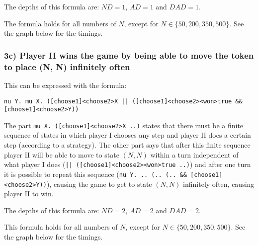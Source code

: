 \documentclass[10pt,a4paper]{article}
\begin{document}
The depths of this formula are: $ND = 1$, $AD = 1$ and $DAD = 1$.

The formula holds for all numbers of $N$, except for $N \in \{50, 200, 350, 500\}$. See the graph below for the timings.


\subsubsection{3c) Player II wins the game by being able to move the token to place (N, N) infinitely often}\label{board3}
This can be expressed with the formula:

\begin{center}
	{\tt nu Y. mu X. ([choose1]<choose2>X || ([choose1]<choose2><won>true \&\& [choose1]<choose2>Y))}
\end{center}

The part {\tt mu X. ([choose1]<choose2>X ..)} states that there must be a finite sequence of states in which player I chooses any step and player II does a certain step (according to a strategy). The other part says that after this finite sequence player II will be able to move to state $(N, N)$ within a turn independent of what player I does ({\tt || ([choose1]<choose2><won>true ..)}) and after one turn it is possible to repeat this sequence ({\tt nu Y. .. (.. (.. \&\& [choose1]<choose2>Y))}), causing the game to get to state $(N, N)$ infinitely often, causing player II to win.

The depths of this formula are: $ND = 2$, $AD = 2$ and $DAD = 2$.

This formula holds for all numbers of $N$, except for $N \in \{50, 200, 350, 500\}$. See the graph below for the timings.

\end{document}
